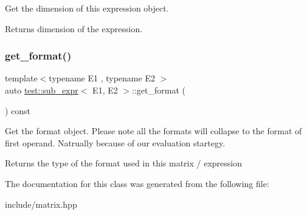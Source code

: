 Get the dimension of this expression object. 

\begin{DoxyReturn}{Returns}
dimension of the expression. 
\end{DoxyReturn}
\mbox{\label{classtest_1_1sub__expr_a6da1993144ab26f2c9fb696893f101ab}} 
\subsubsection{\texorpdfstring{get\_format()}{get\_format()}}
{\footnotesize\ttfamily template$<$typename E1 , typename E2 $>$ \\
auto \mbox{\hyperlink{classtest_1_1sub__expr}{test\+::sub\+\_\+expr}}$<$ E1, E2 $>$\+::get\+\_\+format (\begin{DoxyParamCaption}{ }\end{DoxyParamCaption}) const\hspace{0.3cm}{\ttfamily [inline]}}



Get the format object. Please note all the formats will collapse to the format of first operand. Natrually because of our evaluation startegy. 

\begin{DoxyReturn}{Returns}
the type of the format used in this matrix / expression 
\end{DoxyReturn}


The documentation for this class was generated from the following file\+:\begin{DoxyCompactItemize}
\item 
include/matrix.\+hpp\end{DoxyCompactItemize}
